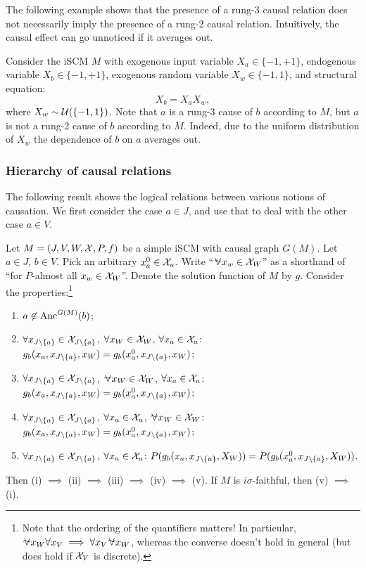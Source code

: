 The following example shows that the presence of a rung-3 causal relation does not necessarily imply the presence of a rung-2 causal relation.
Intuitively, the causal effect can go unnoticed if it averages out.
\begin{Eg}\label{eg:scm_cause_of_rung2_vs_rung3}
  Consider the iSCM $M$ with exogenous input variable $X_a \in \{-1,+1\}$, endogenous variable $X_b \in \{-1,+1\}$, exogenous random variable $X_w \in \{-1,1\}$, and structural equation:
  $$X_b = X_a X_w,$$
  where $X_w \sim \mathcal{U}(\{-1,1\})$.
  Note that $a$ is a rung-3 cause of $b$ according to $M$, but $a$ is not a rung-2 cause of $b$ according to $M$.
  Indeed, due to the uniform distribution of $X_w$ the dependence of $b$ on $a$ averages out.
\end{Eg}

\subsubsection{Hierarchy of causal relations}
The following result shows the logical relations between various notions of causation.
We first consider the case $a \in J$, and use that to deal with the other case $a \in V$.
\begin{Prp}\label{prp:scm_exogenous_input_causes}
  Let $M = \left ( J, V, W, \mathcal{X}, P, f \right )$ be a simple iSCM with causal graph $G(M)$.
  Let $a \in J$, $b \in V$. 
  Pick an arbitrary $x_a^0 \in \mathcal{X}_a$.
  Write ``$\foralmostall x_w \in \CX_W$'' as a shorthand of ``for $P$-almost all $x_w \in \mathcal{X}_W$''.
  Denote the solution function of $M$ by $g$.
  Consider the properties:\footnote{Note that the ordering of the quantifiers matters! In particular, $\foralmostall x_W \forall x_V \implies \forall x_V \foralmostall x_W$, whereas the converse doesn't hold in general (but does hold if $\mathcal{X}_V$ is discrete).}
  \begin{enumerate}[label=(\roman*)]
    \item[(i)]   $a \not\in \mathrm{Anc}^{G(M)}(b)$;
    \item[(ii)]  $\forall x_{J\setminus\{a\}} \in \mathcal{X}_{J\setminus\{a\}}$, $\forall x_W \in \mathcal{X}_W$, $\forall x_a \in \mathcal{X}_a$: $g_b(x_a,x_{J\setminus\{a\}},x_W) = g_b(x_a^0,x_{J\setminus\{a\}},x_W)$;
    \item[(iii)]  $\forall x_{J\setminus\{a\}} \in \mathcal{X}_{J\setminus\{a\}}$, $\foralmostall x_W \in \CX_W$, $\forall x_a \in \mathcal{X}_a$: $g_b(x_a,x_{J\setminus\{a\}},x_W) = g_b(x_a^0,x_{J\setminus\{a\}},x_W)$;
    \item[(iv)]   $\forall x_{J\setminus\{a\}} \in \mathcal{X}_{J\setminus\{a\}}$, $\forall x_a \in \mathcal{X}_a$, $\foralmostall x_W \in \CX_W$: $g_b(x_a,x_{J\setminus\{a\}},x_W) = g_b(x_a^0,x_{J\setminus\{a\}},x_W)$;
    \item[(v)]  $\forall x_{J\setminus\{a\}} \in \mathcal{X}_{J\setminus\{a\}}$, $\forall x_a \in \mathcal{X}_a$: $P(g_b(x_a,x_{J\setminus\{a\}},X_W)) = P(g_b(x_a^0,x_{J\setminus\{a\}},X_W))$.
  \end{enumerate}
  Then (i) $\implies$ (ii) $\implies$ (iii) $\implies$ (iv) $\implies$ (v).
  If $M$ is $i\sigma$-faithful, then (v) $\implies$ (i).
\end{Prp}
